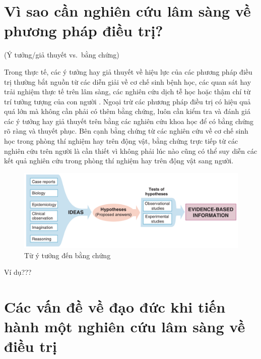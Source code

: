 \documentclass[
]{book}
\begin{document}
\hypertarget{vuxec-sao-cux1ea7n-nghiuxean-cux1ee9u-luxe2m-suxe0ng-vux1ec1-phux1b0ux1a1ng-phuxe1p-ux111iux1ec1u-trux1ecb}{%
\section{Vì sao cần nghiên cứu lâm sàng về phương pháp điều trị?}\label{vuxec-sao-cux1ea7n-nghiuxean-cux1ee9u-luxe2m-suxe0ng-vux1ec1-phux1b0ux1a1ng-phuxe1p-ux111iux1ec1u-trux1ecb}}

(Ý tưởng/giả thuyết vs.~bằng chứng)

Trong thực tế, các ý tưởng hay giả thuyết về hiệu lực của các phương pháp điều trị thường bắt nguồn từ các diễn giải về cơ chế sinh bệnh học, các quan sát hay trải nghiệm thực tế trên lâm sàng, các nghiên cứu dịch tễ học hoặc thậm chí từ trí tưởng tượng của con người \citep{fletcher_clinical_2014}. Ngoại trừ các phương pháp điều trị có hiệu quả quá lớn mà không cần phải có thêm bằng chứng, luôn cần kiểm tra và đánh giá các ý tưởng hay giả thuyết trên bằng các nghiên cứu khoa học để có bằng chứng rõ ràng và thuyết phục. Bên cạnh bằng chứng từ các nghiên cứu về cơ chế sinh học trong phòng thí nghiệm hay trên động vật, bằng chứng trực tiếp từ các nghiên cứu trên người là cần thiết vì không phải lúc nào cũng có thể suy diễn các kết quả nghiên cứu trong phòng thí nghiệm hay trên động vật sang người.

\begin{figure}

{\centering \includegraphics[width=1\linewidth]{figures/dieutri_01} 

}

\caption{Từ ý tưởng đến bằng chứng}\label{fig:unnamed-chunk-7}
\end{figure}

Ví dụ???

\hypertarget{cuxe1c-vux1ea5n-ux111ux1ec1-vux1ec1-ux111ux1ea1o-ux111ux1ee9c-khi-tiux1ebfn-huxe0nh-mux1ed9t-nghiuxean-cux1ee9u-luxe2m-suxe0ng-vux1ec1-ux111iux1ec1u-trux1ecb}{%
\section{Các vấn đề về đạo đức khi tiến hành một nghiên cứu lâm sàng về điều trị}\label{cuxe1c-vux1ea5n-ux111ux1ec1-vux1ec1-ux111ux1ea1o-ux111ux1ee9c-khi-tiux1ebfn-huxe0nh-mux1ed9t-nghiuxean-cux1ee9u-luxe2m-suxe0ng-vux1ec1-ux111iux1ec1u-trux1ecb}}
\end{document}
